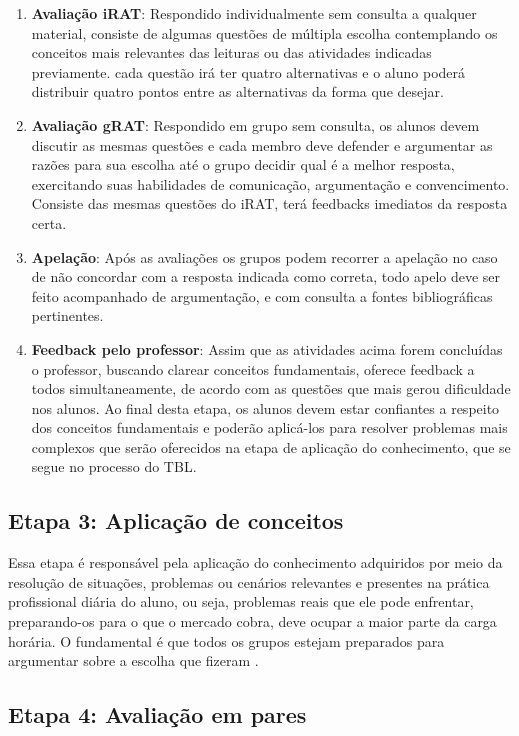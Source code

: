 \begin{enumerate}
  \item \textbf{Avaliação iRAT}: Respondido individualmente sem consulta a qualquer material, consiste de algumas questões de múltipla escolha contemplando os conceitos mais relevantes das leituras ou das atividades indicadas previamente. cada questão irá ter quatro alternativas e o aluno poderá distribuir quatro pontos entre as alternativas da forma que desejar.
  \item \textbf{Avaliação gRAT}: Respondido em grupo sem consulta, os alunos devem discutir as mesmas questões e cada membro deve defender e argumentar as razões para sua escolha até o grupo decidir qual é a melhor resposta, exercitando suas habilidades de comunicação, argumentação e convencimento. Consiste das mesmas questões do iRAT, terá feedbacks imediatos da resposta certa.
  \item \textbf{Apelação}: Após as avaliações os grupos podem recorrer a apelação no caso de não concordar com a resposta indicada como correta, todo apelo deve ser feito acompanhado de argumentação, e com consulta a fontes bibliográficas pertinentes.
  \item \textbf{Feedback pelo professor}: Assim que as atividades acima forem concluídas o professor, buscando clarear conceitos fundamentais, oferece feedback a todos simultaneamente, de acordo com as questões que mais gerou dificuldade nos alunos. Ao final desta etapa, os alunos devem estar confiantes a respeito dos conceitos fundamentais e poderão aplicá-los para resolver problemas mais complexos que serão oferecidos na etapa de aplicação do conhecimento, que se segue no processo do TBL.
\end{enumerate}

\subsection{Etapa 3: Aplicação de conceitos}

Essa etapa é responsável pela aplicação do conhecimento adquiridos por meio da resolução de situações, problemas ou cenários relevantes e presentes na prática profissional diária do aluno, ou seja, problemas reais que ele pode enfrentar, preparando-os para o que o mercado cobra, deve ocupar a maior parte da carga horária. O fundamental é que todos os grupos estejam preparados para argumentar sobre a escolha que fizeram \cite{sweet}.

\subsection{Etapa 4: Avaliação em pares}

